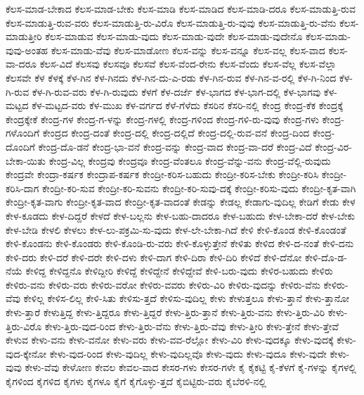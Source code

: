 {ಕೆಲಸ-ಮಾಡ-ಬೇಕಾದ
ಕೆಲಸ-ಮಾಡ-ಬೇಕು
ಕೆಲಸ-ಮಾಡಿ
ಕೆಲಸ-ಮಾಡಿದ
ಕೆಲಸ-ಮಾಡಿ-ದರೂ
ಕೆಲಸ-ಮಾಡುತ್ತಿ-ರುವ
ಕೆಲಸ-ಮಾಡುತ್ತಿ-ರುವ-ವರು
ಕೆಲಸ-ಮಾಡುತ್ತಿ-ರು-ವಿರೊ
ಕೆಲಸ-ಮಾಡುತ್ತಿ-ರು-ವುವು
ಕೆಲಸ-ಮಾಡುತ್ತಿ-ರು-ವೆನು
ಕೆಲಸ-ಮಾಡುತ್ತೀರಿ
ಕೆಲಸ-ಮಾಡುವ
ಕೆಲಸ-ಮಾಡು-ವುದು
ಕೆಲಸ-ಮಾಡು-ವುದೇ
ಕೆಲಸ-ಮಾಡು-ವುದೇನೊ
ಕೆಲಸ-ಮಾಡು-ವುವು-ಅಂತಹ
ಕೆಲಸ-ಮಾಡು-ವೆವು
ಕೆಲಸ-ಮಾಡೋಣ
ಕೆಲಸ-ವನ್ನು
ಕೆಲಸ-ವನ್ನೂ
ಕೆಲಸ-ವಲ್ಲ
ಕೆಲಸ-ವಾದ
ಕೆಲಸ-ವಾ-ದರೂ
ಕೆಲಸ-ವಿದೆ
ಕೆಲಸವು
ಕೆಲಸವೂ
ಕೆಲಸವೆ
ಕೆಲಸ-ವೆಂದ-ರೇನು
ಕೆಲಸ-ವೆಂದು
ಕೆಲಸ-ವೆಲ್ಲ
ಕೆಲಸ-ವೆಲ್ಲಾ
ಕೆಲಸವೇ
ಕೆಳ
ಕೆಳಕ್ಕೆ
ಕೆಳ-ಗಿನ
ಕೆಳ-ಗಿನದು
ಕೆಳ-ಗಿನ-ದು-ಎ-ರಡು
ಕೆಳ-ಗಿನ-ರುವ
ಕೆಳ-ಗಿನ-ವ-ರಲ್ಲಿ
ಕೆಳ-ಗಿ-ನಿಂದ
ಕೆಳ-ಗಿ-ರುವ
ಕೆಳ-ಗಿ-ರುವ-ವರು
ಕೆಳ-ಗಿ-ರುವುದು
ಕೆಳಗೆ
ಕೆಳ-ದರ್ಜೆ
ಕೆಳ-ಭಾಗದ
ಕೆಳ-ಭಾಗ-ದಲ್ಲಿ
ಕೆಳ-ಭಾಗವು
ಕೆಳ-ಮಟ್ಟದ
ಕೆಳ-ಮಟ್ಟದ-ವರು
ಕೆಳ-ಮುಖ
ಕೆಳ-ವರ್ಗದ
ಕೆಳೆ-ಗೆಳೆದು
ಕೆಸರಿನ
ಕೆಸರಿ-ನಲ್ಲಿ
ಕೇಂದ್ರ
ಕೇಂದ್ರ-ಕೆಕ
ಕೇಂದ್ರಕ್ಕೆ
ಕೇಂದ್ರಕ್ಕೇಕೆ
ಕೇಂದ್ರ-ಗಳ
ಕೇಂದ್ರ-ಗ-ಳನ್ನು
ಕೇಂದ್ರ-ಗಳಲ್ಲಿ
ಕೇಂದ್ರ-ಗಳಿಂದ
ಕೇಂದ್ರ-ಗಳಿ-ರು-ವುವು
ಕೇಂದ್ರ-ಗಳು
ಕೇಂದ್ರ-ಗಳೊಂದಿಗೆ
ಕೇಂದ್ರದ
ಕೇಂದ್ರ-ದಂತೆ
ಕೇಂದ್ರ-ದಲ್ಲಿ
ಕೇಂದ್ರ-ದಲ್ಲಿದೆ
ಕೇಂದ್ರ-ದಲ್ಲಿ-ರುವ-ವನೆ
ಕೇಂದ್ರ-ದಿಂದ
ಕೇಂದ್ರ-ದೊಂದಿಗೆ
ಕೇಂದ್ರ-ದೊ-ಡನೆ
ಕೇಂದ್ರ-ಭಾ-ವನೆ
ಕೇಂದ್ರ-ವನ್ನು
ಕೇಂದ್ರ-ವಾದ
ಕೇಂದ್ರ-ವಾ-ದರೆ
ಕೇಂದ್ರ-ವಿದೆ
ಕೇಂದ್ರ-ವಿರ-ಬೇಕಾ-ಯಿತು
ಕೇಂದ್ರ-ವಿಲ್ಲ
ಕೇಂದ್ರವು
ಕೇಂದ್ರವೂ
ಕೇಂದ್ರ-ವೆಂತಲೂ
ಕೇಂದ್ರ-ವೆನ್ನು-ವನು
ಕೇಂದ್ರ-ವೆಲ್ಲಿ-ರುವುದು
ಕೇಂದ್ರವೇ
ಕೇಂದ್ರಾ-ಕರ್ಷಕ
ಕೇಂದ್ರಾಪ-ಕರ್ಷಕ
ಕೇಂದ್ರೀ-ಕರಿಸ-ಬಹುದು
ಕೇಂದ್ರೀ-ಕರಿಸ-ಬೇಕು
ಕೇಂದ್ರೀ-ಕರಿಸಿ
ಕೇಂದ್ರೀ-ಕರಿಸಿ-ದಾಗ
ಕೇಂದ್ರೀ-ಕರಿ-ಸುವ
ಕೇಂದ್ರೀ-ಕರಿ-ಸುವನು
ಕೇಂದ್ರೀ-ಕರಿ-ಸುವು-ದಕ್ಕೆ
ಕೇಂದ್ರೀ-ಕರಿಸು-ವುದು
ಕೇಂದ್ರೀ-ಕೃತ-ವಾಗಿ
ಕೇಂದ್ರೀ-ಕೃತ-ವಾಗು
ಕೇಂದ್ರೀ-ಕೃತ-ವಾದ
ಕೇಂದ್ರೀ-ಕೃತ-ವಾದಂತೆ
ಕೇಡನ್ನು
ಕೇಡಲ್ಲ
ಕೇಡಾಗು-ವುದಿಲ್ಲ
ಕೇಡಿಗೆ
ಕೇಡು
ಕೇಳ
ಕೇಳ-ಕೂಡದು
ಕೇಳ-ದಿದ್ದರೆ
ಕೇಳದೆ
ಕೇಳ-ಬಲ್ಲನು
ಕೇಳ-ಬಹು-ದಾದರೂ
ಕೇಳ-ಬಹುದು
ಕೇಳ-ಬೇಕಾ-ದರೆ
ಕೇಳ-ಬೇಕು
ಕೇಳ-ಬೇಡಿ
ಕೇಳಲಿ
ಕೇಳಲು
ಕೇಳ-ಲು-ಪಕ್ರಮಿ-ಸು-ವುದು
ಕೇಳ-ಲೇ-ಬೇಕಾ-ಗಿದೆ
ಕೇಳಿ
ಕೇಳಿ-ಕೊಂಡ
ಕೇಳಿ-ಕೊಂಡಂತೆ
ಕೇಳಿ-ಕೊಂಡನು
ಕೇಳಿ-ಕೊಂಡರು
ಕೇಳಿ-ಕೊಂಡಿ-ರು-ವರು
ಕೇಳಿ-ಕೊಳ್ಳುತ್ತೇನೆ
ಕೇಳಿತು
ಕೇಳಿದ
ಕೇಳಿ-ದ-ನಂತೆ
ಕೇಳಿ-ದನು
ಕೇಳಿ-ದರು
ಕೇಳಿ-ದರೆ
ಕೇಳಿ-ದರೇ
ಕೇಳಿ-ದಳು
ಕೇಳಿ-ದಾಗ
ಕೇಳಿ-ದಿರಾ
ಕೇಳಿ-ದಿರಿ
ಕೇಳಿದೆ
ಕೇಳಿ-ದೆನೋ
ಕೇಳಿ-ದೊ-ಡ-ನೆಯೆ
ಕೇಳಿದ್ದ
ಕೇಳಿದ್ದನೊ
ಕೇಳಿದ್ದೀರಿ
ಕೇಳಿದ್ದೆ
ಕೇಳಿದ್ದೇನೆ
ಕೇಳಿದ್ದೇವೆ
ಕೇಳಿ-ಬರು-ವುದು
ಕೇಳಿರ-ಬಹುದು
ಕೇಳಿರು
ಕೇಳಿರು-ವನು
ಕೇಳಿರು-ವರು
ಕೇಳಿರು-ವರೋ
ಕೇಳಿರು-ವವರು
ಕೇಳಿರು-ವಿರಿ
ಕೇಳಿರು-ವುದನ್ನು
ಕೇಳಿರು-ವೆನು
ಕೇಳಿರು-ವೆವು
ಕೇಳಿಲ್ಲ
ಕೇಳಿಸ-ಲಿಲ್ಲ
ಕೇಳಿ-ಸಿತು
ಕೇಳಿಸು-ತ್ತದೆ
ಕೇಳಿಸು-ವುದಿಲ್ಲ
ಕೇಳು
ಕೇಳುತ್ತಲೂ
ಕೇಳು-ತ್ತಾನೆ
ಕೇಳು-ತ್ತಾನೋ
ಕೇಳು-ತ್ತಾರೆ
ಕೇಳುತ್ತಿದ್ದ
ಕೇಳು-ತ್ತಿದ್ದರೂ
ಕೇಳು-ತ್ತಿದ್ದರೆ
ಕೇಳು-ತ್ತಿರು-ತ್ತಾನೆ
ಕೇಳು-ತ್ತಿರು-ವನು
ಕೇಳು-ತ್ತಿರು-ವಿರಿ
ಕೇಳು-ತ್ತಿರು-ವಿರೊ
ಕೇಳು-ತ್ತಿರು-ವುದ-ರಿಂದ
ಕೇಳು-ತ್ತಿರು-ವೆನು
ಕೇಳು-ತ್ತಿರು-ವೆವು
ಕೇಳು-ತ್ತೀರಿ
ಕೇಳು-ತ್ತೇನೆ
ಕೇಳು-ತ್ತೇವೆ
ಕೇಳುವ
ಕೇಳು-ವನು
ಕೇಳು-ವನೋ
ಕೇಳು-ವರು
ಕೇಳು-ವವ-ರೆಲ್ಲೋ
ಕೇಳು-ವಿರಿ
ಕೇಳು-ವುದಕ್ಕೂ
ಕೇಳು-ವುದಕ್ಕೆ
ಕೇಳು-ವುದ-ಕ್ಕೇನೋ
ಕೇಳು-ವುದ-ರಿಂದ
ಕೇಳು-ವುದಿಲ್ಲ
ಕೇಳು-ವುದಿಲ್ಲವೊ
ಕೇಳು-ವುದು
ಕೇಳು-ವುದೂ
ಕೇಳು-ವುದೇ
ಕೇಳು-ವುವು
ಕೇಳು-ವೆವು
ಕೇಳೋಣ
ಕೇವಲ
ಕೇವಲ-ವಾದ
ಕೇಸರ-ಗಳು
ಕೇಸರ-ಗಳೇ
ಕೈ
ಕೈಕಟ್ಟಿ
ಕೈ-ಕೆಳಗೆ
ಕೈ-ಗಳನ್ನು
ಕೈಗಳಲ್ಲಿ
ಕೈಗಳಿಂದ
ಕೈಗಳಿದ
ಕೈಗಳು
ಕೈಗಳೂ
ಕೈಗೆ
ಕೈಗೊಳ್ಳು-ತ್ತದೆ
ಕೈಬಿಟ್ಟಿರು-ವರು
ಕೈಬೆರಳಿ-ನಲ್ಲಿ
}
